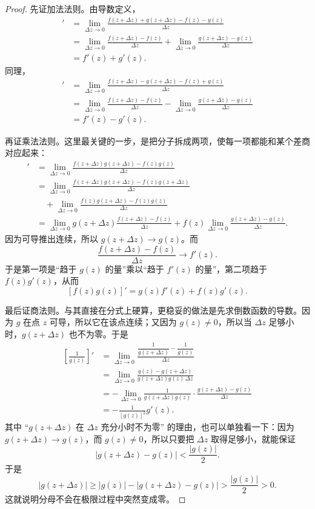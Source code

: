 \begin{proof}
先证加法法则。由导数定义，
\begin{align*}
    [f(z)+g(z)]'
    &=\lim_{\Delta z\to 0}
    \frac{f(z+\Delta z)+g(z+\Delta z)-f(z)-g(z)}{\Delta z}\\
    &=\lim_{\Delta z\to 0}\frac{f(z+\Delta z)-f(z)}{\Delta z}
      +\lim_{\Delta z\to 0}\frac{g(z+\Delta z)-g(z)}{\Delta z}\\
    &=f'(z)+g'(z).
\end{align*}
同理，
\begin{align*}
    [f(z)-g(z)]'
    &=\lim_{\Delta z\to 0}
    \frac{f(z+\Delta z)-g(z+\Delta z)-f(z)+g(z)}{\Delta z}\\
    &=\lim_{\Delta z\to 0}\frac{f(z+\Delta z)-f(z)}{\Delta z}
      -\lim_{\Delta z\to 0}\frac{g(z+\Delta z)-g(z)}{\Delta z}\\
    &=f'(z)-g'(z).
\end{align*}

再证乘法法则。这里最关键的一步，是把分子拆成两项，使每一项都能和某个差商对应起来：
\begin{align*}
    [f(z)g(z)]'
    &=\lim_{\Delta z\to 0}\frac{f(z+\Delta z)g(z+\Delta z)-f(z)g(z)}{\Delta z}\\
    &=\lim_{\Delta z\to 0}\frac{f(z+\Delta z)g(z+\Delta z)-f(z)g(z+\Delta z)}{\Delta z}\\
    &\quad+\lim_{\Delta z\to 0}\frac{f(z)g(z+\Delta z)-f(z)g(z)}{\Delta z}\\
    &=\lim_{\Delta z\to 0}g(z+\Delta z)\frac{f(z+\Delta z)-f(z)}{\Delta z}
      +f(z)\lim_{\Delta z\to 0}\frac{g(z+\Delta z)-g(z)}{\Delta z}.
\end{align*}
因为可导推出连续，所以 $g(z+\Delta z)\to g(z)$。而
\[
    \frac{f(z+\Delta z)-f(z)}{\Delta z}\to f'(z).
\]
于是第一项是``趋于 $g(z)$ 的量''乘以``趋于 $f'(z)$ 的量''，第二项趋于 $f(z)g'(z)$，从而
\[
    [f(z)g(z)]'=g(z)f'(z)+f(z)g'(z).
\]

最后证商法则。与其直接在分式上硬算，更稳妥的做法是先求倒数函数的导数。因为 $g$ 在点 $z$ 可导，所以它在该点连续；又因为 $g(z)\neq 0$，所以当 $\Delta z$ 足够小时，$g(z+\Delta z)$ 也不为零。于是
\begin{align*}
    \left[\frac{1}{g(z)}\right]'
    &=\lim_{\Delta z\to 0}
    \frac{\dfrac{1}{g(z+\Delta z)}-\dfrac{1}{g(z)}}{\Delta z}\\
    &=\lim_{\Delta z\to 0}
    \frac{g(z)-g(z+\Delta z)}{g(z+\Delta z)g(z)\,\Delta z}\\
    &=-\lim_{\Delta z\to 0}
    \frac{1}{g(z+\Delta z)g(z)}
    \cdot
    \frac{g(z+\Delta z)-g(z)}{\Delta z}\\
    &=-\frac{1}{[g(z)]^2}g'(z).
\end{align*}
其中 ``$g(z+\Delta z)$ 在 $\Delta z$ 充分小时不为零'' 的理由，也可以单独看一下：因为 $g(z+\Delta z)\to g(z)$，而 $g(z)\neq 0$，所以只要把 $\Delta z$ 取得足够小，就能保证
\[
    |g(z+\Delta z)-g(z)|<\frac{|g(z)|}{2}.
\]
于是
\[
    |g(z+\Delta z)|
    \ge |g(z)|-|g(z+\Delta z)-g(z)|
    >\frac{|g(z)|}{2}>0.
\]
这就说明分母不会在极限过程中突然变成零。


\end{proof}

